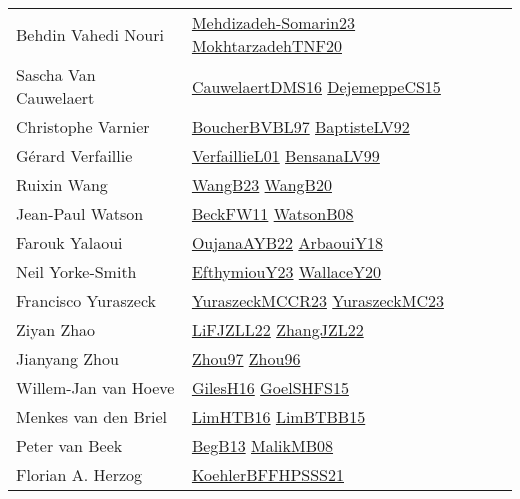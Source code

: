 {\begin{longtable}{p{4cm}p{20cm}}
Behdin Vahedi Nouri & \href{papers/Mehdizadeh-Somarin23.pdf}{Mehdizadeh-Somarin23}\cite{Mehdizadeh-Somarin23} \href{}{MokhtarzadehTNF20}\cite{MokhtarzadehTNF20} \\
Sascha Van Cauwelaert & \href{papers/CauwelaertDMS16.pdf}{CauwelaertDMS16}\cite{CauwelaertDMS16} \href{papers/DejemeppeCS15.pdf}{DejemeppeCS15}\cite{DejemeppeCS15} \\
Christophe Varnier & \href{}{BoucherBVBL97}\cite{BoucherBVBL97} \href{papers/BaptisteLV92.pdf}{BaptisteLV92}\cite{BaptisteLV92} \\
G{\'{e}}rard Verfaillie & \href{papers/VerfaillieL01.pdf}{VerfaillieL01}\cite{VerfaillieL01} \href{articles/BensanaLV99.pdf}{BensanaLV99}\cite{BensanaLV99} \\
Ruixin Wang & \href{papers/WangB23.pdf}{WangB23}\cite{WangB23} \href{papers/WangB20.pdf}{WangB20}\cite{WangB20} \\
Jean{-}Paul Watson & \href{}{BeckFW11}\cite{BeckFW11} \href{papers/WatsonB08.pdf}{WatsonB08}\cite{WatsonB08} \\
Farouk Yalaoui & \href{papers/OujanaAYB22.pdf}{OujanaAYB22}\cite{OujanaAYB22} \href{papers/ArbaouiY18.pdf}{ArbaouiY18}\cite{ArbaouiY18} \\
Neil Yorke{-}Smith & \href{papers/EfthymiouY23.pdf}{EfthymiouY23}\cite{EfthymiouY23} \href{articles/WallaceY20.pdf}{WallaceY20}\cite{WallaceY20} \\
Francisco Yuraszeck & \href{articles/YuraszeckMCCR23.pdf}{YuraszeckMCCR23}\cite{YuraszeckMCCR23} \href{papers/YuraszeckMC23.pdf}{YuraszeckMC23}\cite{YuraszeckMC23} \\
Ziyan Zhao & \href{papers/LiFJZLL22.pdf}{LiFJZLL22}\cite{LiFJZLL22} \href{papers/ZhangJZL22.pdf}{ZhangJZL22}\cite{ZhangJZL22} \\
Jianyang Zhou & \href{articles/Zhou97.pdf}{Zhou97}\cite{Zhou97} \href{papers/Zhou96.pdf}{Zhou96}\cite{Zhou96} \\
Willem{-}Jan van Hoeve & \href{papers/GilesH16.pdf}{GilesH16}\cite{GilesH16} \href{articles/GoelSHFS15.pdf}{GoelSHFS15}\cite{GoelSHFS15} \\
Menkes van den Briel & \href{papers/LimHTB16.pdf}{LimHTB16}\cite{LimHTB16} \href{papers/LimBTBB15.pdf}{LimBTBB15}\cite{LimBTBB15} \\
Peter van Beek & \href{}{BegB13}\cite{BegB13} \href{}{MalikMB08}\cite{MalikMB08} \\
Florian A. Herzog & \href{articles/KoehlerBFFHPSSS21.pdf}{KoehlerBFFHPSSS21}\cite{KoehlerBFFHPSSS21} \\

\end{longtable}}
